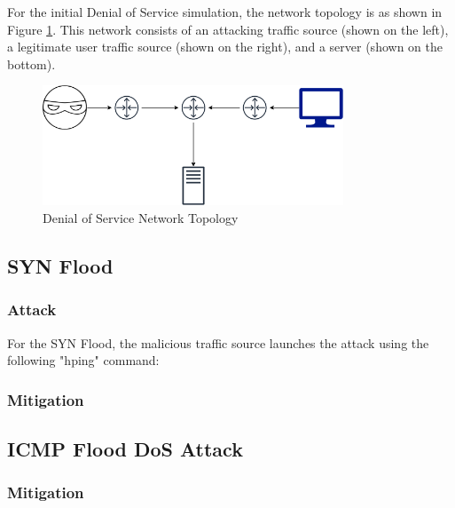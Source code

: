 For the initial Denial of Service simulation, the network topology is as shown
in Figure \ref{fig:dosNetwork}. This network consists of an attacking traffic
source (shown on the left), a legitimate user traffic source (shown on the
right), and a server (shown on the bottom).

\begin{figure}[H]
	\centering
	\includegraphics[width=0.8\textwidth]{images/DoS}
	\caption{Denial of Service Network Topology}
	\label{fig:dosNetwork}
\end{figure}

\subsection{SYN Flood}

\subsubsection{Attack}

For the SYN Flood, the malicious traffic source launches the attack using the
following "hping" command:


\subsubsection{Mitigation}

\subsection {ICMP Flood DoS Attack}


\subsubsection{Mitigation}
